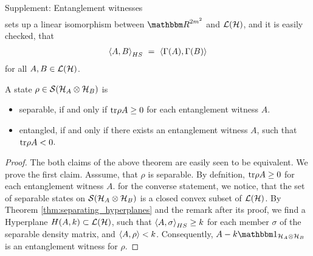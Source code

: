 \begin{section}{Supplement: Entanglement witnesses}
\begin{align}
     \end{align}
     sets up a linear isomorphism between $\bbmR^{2m^2}$ and ${\mathcal L}({\mathcal H})$, and it is easily checked, that
     \begin{align}
      \braket{A,B}_{HS} \ = \ \braket{\Gamma(A), \Gamma(B)} 
     \end{align}
     for all $A,B \in {\mathcal L}({\mathcal H})$. 
     \begin{theorem}
      A state $\rho \in {\mathcal S}({\mathcal H}_A \otimes {\mathcal H}_B)$ is
     \begin{itemize}
      \item separable, if and only if $\mathrm{tr}\rho A \geq 0$ for each entanglement witness $A$. 
      \item entangled, if and only if there exists an entanglement witness $A$, such that $\mathrm{tr} \rho A < 0$.
     \end{itemize}
     \end{theorem}
     \begin{proof}
      The both claims of the above theorem are easily seen to be equivalent. We prove the first claim. Asssume, that $\rho$ is separable. By defnition, $\mathrm{tr} \rho A \geq 0$ for each entanglement 
      witness $A$. for the converse statement, we notice, that the set of separable states on ${\mathcal S}({\mathcal H}_A \otimes {\mathcal H}_B)$ is a closed convex subset of ${\mathcal L}({\mathcal H})$. By Theorem \ref{thm:separating_hyperplanes} and
      the remark after its proof, we find a Hyperplane $H(A,k) \subset {\mathcal L}({\mathcal H})$, such that $\braket{A,\sigma}_{HS} \geq k$ for each member $\sigma$ of the separable density matrix, and $\braket{A,\rho} < k$.
      Consequently, $A - k \bbmeins_{\cH_A \otimes \cH_B}$ is an entanglement witness for $\rho$.
     \end{proof}
    \end{section}

